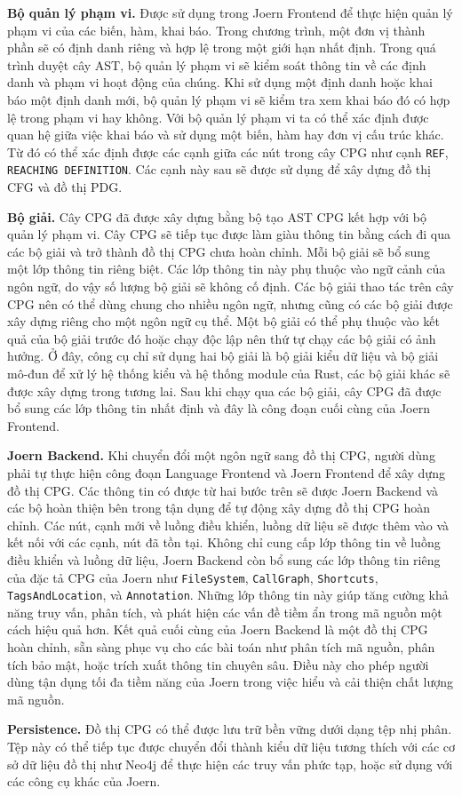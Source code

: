 \textbf{Bộ quản lý phạm vi.} Được sử dụng trong Joern Frontend để thực hiện quản lý phạm vi của các biến, hàm, khai báo.
Trong chương trình, một đơn vị thành phần sẽ có định danh riêng và hợp lệ trong một giới hạn nhất định.
Trong quá trình duyệt cây AST, bộ quản lý phạm vi sẽ kiểm soát thông tin về các định danh và phạm vi hoạt động của chúng.
Khi sử dụng một định danh hoặc khai báo một định danh mới, bộ quản lý phạm vi sẽ kiểm tra xem khai báo đó có hợp lệ trong phạm vi hay không.
Với bộ quản lý phạm vi ta có thể xác định được quan hệ giữa việc khai báo và sử dụng một biến, hàm hay đơn vị cấu trúc khác.
Từ đó có thể xác định được các cạnh giữa các nút trong cây CPG như cạnh \texttt{REF}, \texttt{REACHING DEFINITION}.
Các cạnh này sau sẽ được sử dụng để xây dựng đồ thị CFG và đồ thị PDG.

\textbf{Bộ giải.} Cây CPG đã được xây dựng bằng bộ tạo AST CPG kết hợp với bộ quản lý phạm vi.
Cây CPG sẽ tiếp tục được làm giàu thông tin bằng cách đi qua các bộ giải và trở thành đồ thị CPG chưa hoàn chỉnh.
Mỗi bộ giải sẽ bổ sung một lớp thông tin riêng biệt.
Các lớp thông tin này phụ thuộc vào ngữ cảnh của ngôn ngữ, do vậy số lượng bộ giải sẽ không cố định.
Các bộ giải thao tác trên cây CPG nên có thể dùng chung cho nhiều ngôn ngữ, nhưng cũng có các bộ giải được xây dựng riêng cho một ngôn ngữ cụ thể.
Một bộ giải có thể phụ thuộc vào kết quả của bộ giải trước đó hoặc chạy độc lập nên thứ tự chạy các bộ giải có ảnh hưởng.
Ở đây, công cụ chỉ sử dụng hai bộ giải là bộ giải kiểu dữ liệu và bộ giải mô-đun để xử lý hệ thống kiểu và hệ thống module của Rust, các bộ giải khác sẽ được xây dựng trong tương lai.
Sau khi chạy qua các bộ giải, cây CPG đã được bổ sung các lớp thông tin nhất định và đây là công đoạn cuối cùng của Joern Frontend.

\textbf{Joern Backend.} Khi chuyển đổi một ngôn ngữ sang đồ thị CPG, người dùng phải tự thực hiện công đoạn Language Frontend và Joern Frontend để xây dựng đồ thị CPG.
Các thông tin có được từ hai bước trên sẽ được Joern Backend và các bộ hoàn thiện bên trong tận dụng để tự động xây dựng đồ thị CPG hoàn chỉnh.
Các nút, cạnh mới về luồng điều khiển, luồng dữ liệu sẽ được thêm vào và kết nối với các cạnh, nút đã tồn tại.
Không chỉ cung cấp lớp thông tin về luồng điều khiển và luồng dữ liệu, Joern Backend còn bổ sung các lớp thông tin riêng của đặc tả CPG của Joern như \texttt{FileSystem}, \texttt{CallGraph}, \texttt{Shortcuts}, \texttt{TagsAndLocation}, và \texttt{Annotation}.
Những lớp thông tin này giúp tăng cường khả năng truy vấn, phân tích, và phát hiện các vấn đề tiềm ẩn trong mã nguồn một cách hiệu quả hơn.
Kết quả cuối cùng của Joern Backend là một đồ thị CPG hoàn chỉnh, sẵn sàng phục vụ cho các bài toán như phân tích mã nguồn, phân tích bảo mật, hoặc trích xuất thông tin chuyên sâu.
Điều này cho phép người dùng tận dụng tối đa tiềm năng của Joern trong việc hiểu và cải thiện chất lượng mã nguồn.

\textbf{Persistence.} Đồ thị CPG có thể được lưu trữ bền vững dưới dạng tệp nhị phân.
Tệp này có thể tiếp tục được chuyển đổi thành kiểu dữ liệu tương thích với các cơ sở dữ liệu đồ thị như Neo4j để thực hiện các truy vấn phức tạp, hoặc sử dụng với các công cụ khác của Joern.
